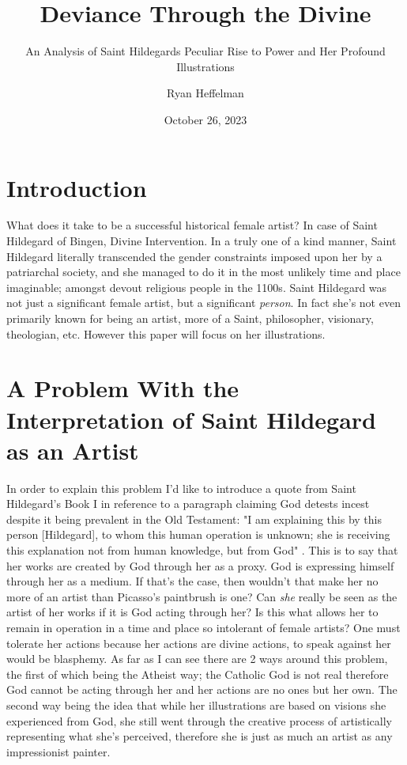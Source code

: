 \documentclass{turabian-researchpaper}
\title{Deviance Through the Divine}
\subtitle{An Analysis of Saint Hildegards Peculiar Rise to Power and Her Profound Illustrations}
\author{Ryan Heffelman}
\date{October 26, 2023}
\begin{document}
\maketitle
\section{Introduction}
What does it take to be a successful historical female artist? In case of Saint Hildegard of Bingen, Divine Intervention.
In a truly one of a kind manner, Saint Hildegard literally transcended the gender constraints imposed upon her by a patriarchal
society, and she managed to do it in the most unlikely time and place imaginable; amongst devout religious people in the 1100s.
Saint Hildegard was not just a significant female artist, but a significant \emph{person}. In fact she's not even primarily known
for being an artist, more of a Saint, philosopher, visionary, theologian, etc. However this paper will focus on her illustrations.

\section{A Problem With the Interpretation of Saint Hildegard as an Artist}
In order to explain this problem I'd like to introduce a quote from Saint Hildegard's\autocite{scivias} Book I in reference to
a paragraph claiming God detests incest despite it being prevalent in the Old Testament:
"I am explaining this by this person [Hildegard], to whom this human operation is unknown; she is receiving this 
explanation not from human knowledge, but from God" \autocite[82]{scivias}. This is to say that her works are created by God through her as a proxy. 
God is expressing himself through her as a medium. If that's the case, then wouldn't that make her no more of an artist than 
Picasso's paintbrush is one?
Can \emph{she} really be seen as the artist of her works if it is God acting through her? Is this what allows her 
to remain in operation in a time and place so intolerant of female artists? One must tolerate her actions because her actions
are divine actions, to speak against her would be blasphemy. As far as I can see there are 2 ways around this problem, the
first of which being the Atheist way; the Catholic God is not real therefore God cannot be acting through her and her actions
are no ones but her own. The second way being the idea that while her illustrations are based on visions she experienced 
from God, she still went through the creative process of artistically representing what she's perceived, therefore
she is just as much an artist as any impressionist painter.
\end{document}

